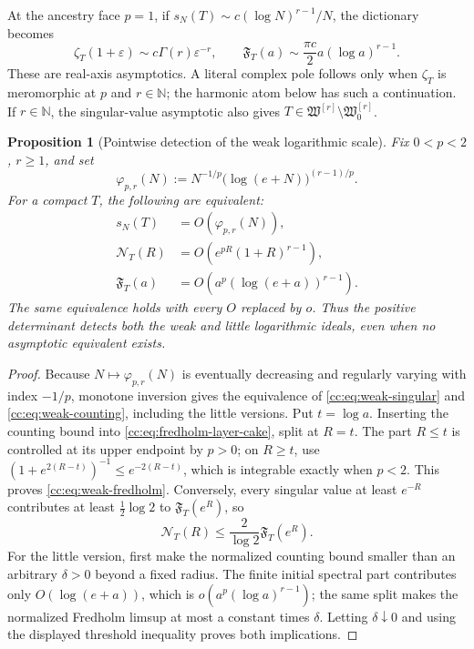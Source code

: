 \documentclass[10pt,reqno]{amsart}
\theoremstyle{plain}
\newtheorem{proposition}[theorem]{Proposition}
\theoremstyle{definition}
\theoremstyle{remark}
\begin{document}
At the ancestry face \(p=1\), if
\(s_N(T)\sim c(\log N)^{r-1}/N\), the dictionary becomes
\begin{equation}
 \zeta_T(1+\varepsilon)
 \sim c\Gamma(r)\varepsilon^{-r},
 \qquad
 \mathfrak F_T(a)
 \sim\frac{\pi c}{2}a(\log a)^{r-1}.
 \label{cc:eq:p-one-dictionary}
\end{equation}
These are real-axis asymptotics.  A literal complex pole follows only when
\(\zeta_T\) is meromorphic at \(p\) and \(r\in\mathbb N\); the harmonic atom
below has such a continuation.  If \(r\in\mathbb N\), the singular-value
asymptotic also gives
\(T\in\mathfrak W^{[r]}\setminus\mathfrak W^{[r]}_0\).

\begin{proposition}[Pointwise detection of the weak logarithmic scale]
\label{cc:prop:weak-detection}
Fix \(0<p<2\), \(r\geq1\), and set
\[
 \varphi_{p,r}(N)
 :=N^{-1/p}\bigl(\log(e+N)\bigr)^{(r-1)/p}.
\]
For a compact \(T\), the following are equivalent:
\begin{align}
 s_N(T)&=O(\varphi_{p,r}(N)),\label{cc:eq:weak-singular}\\
 \mathcal N_T(R)&=O(e^{pR}(1+R)^{r-1}),\label{cc:eq:weak-counting}\\
 \mathfrak F_T(a)&=O(a^p(\log(e+a))^{r-1}).
 \label{cc:eq:weak-fredholm}
\end{align}
The same equivalence holds with every \(O\) replaced by \(o\).
Thus the positive determinant detects both the weak and little
logarithmic ideals, even when no asymptotic equivalent exists.
\end{proposition}

\begin{proof}
Because \(N\mapsto\varphi_{p,r}(N)\) is eventually decreasing and regularly
varying with index \(-1/p\), monotone inversion gives the equivalence of
\eqref{cc:eq:weak-singular} and \eqref{cc:eq:weak-counting}, including
the little versions.  Put \(t=\log a\).  Inserting the counting bound into
\eqref{cc:eq:fredholm-layer-cake}, split at \(R=t\).  The part \(R\leq t\)
is controlled at its upper endpoint by \(p>0\); on \(R\geq t\), use
\((1+e^{2(R-t)})^{-1}\leq e^{-2(R-t)}\), which is integrable exactly when
\(p<2\).  This proves \eqref{cc:eq:weak-fredholm}.  Conversely, every singular value at least
\(e^{-R}\) contributes at least \(\frac12\log2\) to
\(\mathfrak F_T(e^R)\), so
\[
 \mathcal N_T(R)\leq\frac{2}{\log2}\mathfrak F_T(e^R).
\]
For the little version, first make the normalized counting bound smaller
than an arbitrary \(\delta>0\) beyond a fixed radius.  The finite initial
spectral part contributes only \(O(\log(e+a))\), which is
\(o(a^p(\log a)^{r-1})\); the same split makes the normalized Fredholm
limsup at most a constant times \(\delta\).  Letting \(\delta\downarrow0\)
and using the displayed threshold inequality proves both implications.
\end{proof}
\end{document}

